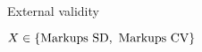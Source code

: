 \documentclass[10pt,english,slidetop,compress,
              blue,mathserif,color=option]{beamer}
\theoremstyle{plain}
\theoremstyle{definition}
\begin{document}
\begin{frame}{External validity}













  

  \break

    $X \in \{ \textup{Markups SD}, \textup{ Markups CV} \}$


\end{frame}
\end{document}
